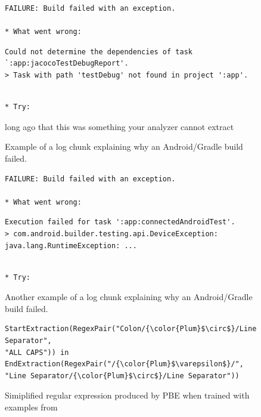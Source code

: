 \begin{figure}[!t]
  \centering
  \begin{lstlisting}[breaklines=true,frame=tlr]
FAILURE: Build failed with an exception.

* What went wrong:
  \end{lstlisting}
  \vspace{-\baselineskip}
  \begin{lstlisting}[backgroundcolor=\color{Cerulean!60},breaklines=true,frame=rl]
Could not determine the dependencies of task `:app:jacocoTestDebugReport'.
> Task with path 'testDebug' not found in project ':app'.
  \end{lstlisting}
  \vspace{-\baselineskip}
  \begin{lstlisting}[breaklines=true,frame=blr]

* Try:
  \end{lstlisting}
  \caption{Example of a log chunk explaining why an Android/Gradle
  build failed.}
  long ago that this was something your analyzer cannot extract
  \label{lst:chunk-example-1}
\end{figure}

\begin{figure}[!t]
  \centering
  \begin{lstlisting}[breaklines=true,frame=tlr]
FAILURE: Build failed with an exception.

* What went wrong:
  \end{lstlisting}
  \vspace{-\baselineskip}
  \begin{lstlisting}[backgroundcolor=\color{Cerulean!60},breaklines=true,frame=rl]
Execution failed for task ':app:connectedAndroidTest'.
> com.android.builder.testing.api.DeviceException:
java.lang.RuntimeException: ...
  \end{lstlisting}
  \vspace{-\baselineskip}
  \begin{lstlisting}[breaklines=true,frame=blr]

* Try:
  \end{lstlisting}
  \caption{Another example of a log chunk explaining why an Android/Gradle
  build failed.}
  \label{lst:chunk-example-2}
\end{figure}

\begin{figure}[!t]
  \centering
  \begin{lstlisting}[breaklines=true]
StartExtraction(RegexPair("Colon/{\color{Plum}$\circ$}/Line Separator",
"ALL CAPS")) in EndExtraction(RegexPair("/{\color{Plum}$\varepsilon$}/",
"Line Separator/{\color{Plum}$\circ$}/Line Separator"))
  \end{lstlisting}
  \caption{Simiplified regular expression produced by PBE when trained
  with examples from }
  \label{lst:prose-program-simplified}
\end{figure}

